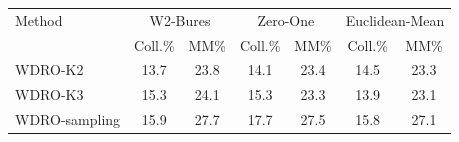 \begin{tabular}{lcccccc}
\toprule
Method & \multicolumn{2}{c}{W2-Bures} & \multicolumn{2}{c}{Zero-One} & \multicolumn{2}{c}{Euclidean-Mean} \\
 & Coll.\% & MM\% & Coll.\% & MM\% & Coll.\% & MM\% \\
\midrule
WDRO-K2 & 13.7 & 23.8 & 14.1 & 23.4 & 14.5 & 23.3 \\
WDRO-K3 & 15.3 & 24.1 & 15.3 & 23.3 & 13.9 & 23.1 \\
WDRO-sampling & 15.9 & 27.7 & 17.7 & 27.5 & 15.8 & 27.1 \\
\bottomrule
\end{tabular}

